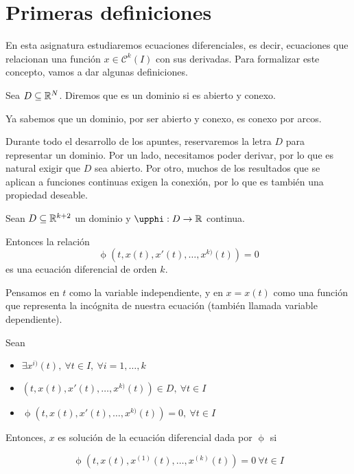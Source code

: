 
\section{Primeras definiciones}

En esta asignatura estudiaremos ecuaciones diferenciales, es decir, ecuaciones que relacionan una función $x \in \mathscr{C}^k(I)$
con sus derivadas. Para formalizar este concepto, vamos a dar algunas definiciones.

\begin{ndef}[Dominio]
  Sea $D \subseteq \mathbb{R}^N$. Diremos que es un dominio si es abierto y conexo.
\end{ndef}

\begin{nota}
Ya sabemos que un dominio, por ser abierto y conexo, es conexo por arcos.	
\end{nota}

Durante todo el desarrollo de los apuntes, reservaremos la letra $D$ para representar un dominio. Por un lado, necesitamos poder derivar, por lo que es natural exigir que $D$ sea abierto. Por otro, muchos de los resultados que se aplican a funciones continuas exigen la conexión, por lo que es también una propiedad deseable.

\begin{ndef}
  Sean $D \subseteq \mathbb{R}^{k+2}$ un dominio y $\upphi : D \to \R$ continua.

  Entonces la relación
  \[\upphi\left(t, x(t), x'(t), \dots, x^{k)}(t)\right) = 0\]
  es una ecuación diferencial de orden $k$.
\end{ndef}

Pensamos en $t$ como la variable independiente, y en $x=x(t)$ como una función que representa la incógnita de nuestra ecuación (también llamada variable dependiente).

\begin{ndef}
  Sean 
  \begin{itemize}
  \item $\exists x^{i)}(t), \ \forall t \in I, \ \forall i=1,\dots,k$
  \item $(t, x(t), x'(t), \dots, x^{k)}(t)) \in D, \ \forall t \in I$
  \item $\upphi(t, x(t), x'(t), \dots, x^{k)}(t)) = 0, \ \forall t \in I$
  \end{itemize}

  Entonces, $x$ es solución de la ecuación diferencial dada por $\upphi$ si

  \[
    \upphi(t, x(t), x^{(1)}(t), \dots, x^{(k)}(t)) = 0 \ \forall t \in I
  \]
\end{ndef}


